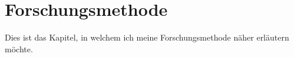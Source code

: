 \chapter{Forschungsmethode} %
\label{Research} %

Dies ist das Kapitel, in welchem ich meine Forschungsmethode näher erläutern möchte.